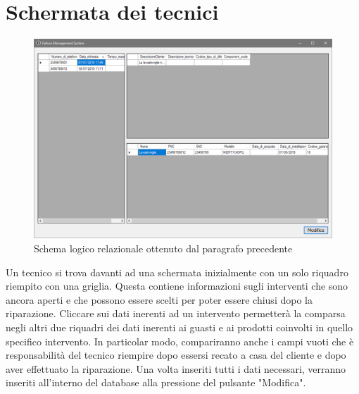 \documentclass[a4paper, 12pt]{report}
\begin{document}
\section{Schermata dei tecnici}

\begin{figure}[H]
	\centering
	\includegraphics[width=\linewidth]{images/technicianScreen.png}
	\caption{Schema logico relazionale ottenuto dal paragrafo precedente}
\end{figure}

Un tecnico si trova davanti ad una schermata inizialmente con un solo riquadro riempito con una griglia. Questa contiene informazioni sugli interventi che sono ancora aperti e che
possono essere scelti per poter essere chiusi dopo la riparazione. Cliccare sui dati inerenti ad un intervento permetterà la comparsa negli altri due riquadri dei dati inerenti ai
guasti e ai prodotti coinvolti in quello specifico intervento. In particolar modo, compariranno anche i campi vuoti che è responsabilità del tecnico riempire dopo essersi recato a
casa del cliente e dopo aver effettuato la riparazione. Una volta inseriti tutti i dati necessari, verranno inseriti all'interno del database alla pressione del pulsante "Modifica".
\end{document}
